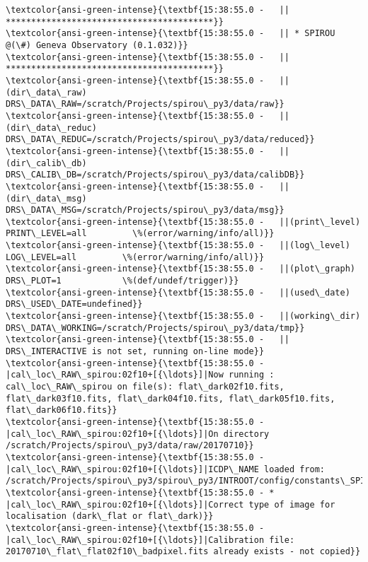 \documentclass[11pt]{article}
\begin{document}
    \begin{Verbatim}[commandchars=\\\{\}]
\textcolor{ansi-green-intense}{\textbf{15:38:55.0 -   || *****************************************}}
\textcolor{ansi-green-intense}{\textbf{15:38:55.0 -   || * SPIROU @(\#) Geneva Observatory (0.1.032)}}
\textcolor{ansi-green-intense}{\textbf{15:38:55.0 -   || *****************************************}}
\textcolor{ansi-green-intense}{\textbf{15:38:55.0 -   ||(dir\_data\_raw)      DRS\_DATA\_RAW=/scratch/Projects/spirou\_py3/data/raw}}
\textcolor{ansi-green-intense}{\textbf{15:38:55.0 -   ||(dir\_data\_reduc)    DRS\_DATA\_REDUC=/scratch/Projects/spirou\_py3/data/reduced}}
\textcolor{ansi-green-intense}{\textbf{15:38:55.0 -   ||(dir\_calib\_db)      DRS\_CALIB\_DB=/scratch/Projects/spirou\_py3/data/calibDB}}
\textcolor{ansi-green-intense}{\textbf{15:38:55.0 -   ||(dir\_data\_msg)      DRS\_DATA\_MSG=/scratch/Projects/spirou\_py3/data/msg}}
\textcolor{ansi-green-intense}{\textbf{15:38:55.0 -   ||(print\_level)       PRINT\_LEVEL=all         \%(error/warning/info/all)}}
\textcolor{ansi-green-intense}{\textbf{15:38:55.0 -   ||(log\_level)         LOG\_LEVEL=all         \%(error/warning/info/all)}}
\textcolor{ansi-green-intense}{\textbf{15:38:55.0 -   ||(plot\_graph)        DRS\_PLOT=1            \%(def/undef/trigger)}}
\textcolor{ansi-green-intense}{\textbf{15:38:55.0 -   ||(used\_date)         DRS\_USED\_DATE=undefined}}
\textcolor{ansi-green-intense}{\textbf{15:38:55.0 -   ||(working\_dir)       DRS\_DATA\_WORKING=/scratch/Projects/spirou\_py3/data/tmp}}
\textcolor{ansi-green-intense}{\textbf{15:38:55.0 -   ||                    DRS\_INTERACTIVE is not set, running on-line mode}}
\textcolor{ansi-green-intense}{\textbf{15:38:55.0 -   |cal\_loc\_RAW\_spirou:02f10+[{\ldots}]|Now running : cal\_loc\_RAW\_spirou on file(s): flat\_dark02f10.fits, flat\_dark03f10.fits, flat\_dark04f10.fits, flat\_dark05f10.fits, flat\_dark06f10.fits}}
\textcolor{ansi-green-intense}{\textbf{15:38:55.0 -   |cal\_loc\_RAW\_spirou:02f10+[{\ldots}]|On directory /scratch/Projects/spirou\_py3/data/raw/20170710}}
\textcolor{ansi-green-intense}{\textbf{15:38:55.0 -   |cal\_loc\_RAW\_spirou:02f10+[{\ldots}]|ICDP\_NAME loaded from: /scratch/Projects/spirou\_py3/spirou\_py3/INTROOT/config/constants\_SPIROU.py}}
\textcolor{ansi-green-intense}{\textbf{15:38:55.0 - * |cal\_loc\_RAW\_spirou:02f10+[{\ldots}]|Correct type of image for localisation (dark\_flat or flat\_dark)}}
\textcolor{ansi-green-intense}{\textbf{15:38:55.0 -   |cal\_loc\_RAW\_spirou:02f10+[{\ldots}]|Calibration file: 20170710\_flat\_flat02f10\_badpixel.fits already exists - not copied}}

\end{Verbatim}
\end{document}
